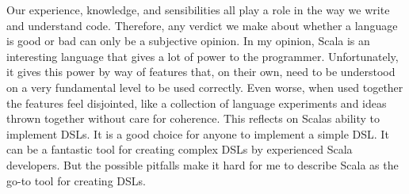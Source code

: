 Our experience, knowledge, and sensibilities all play a role in the way we write and understand code. Therefore, any verdict we make about whether a language is good or bad can only be a subjective opinion. In my opinion, Scala is an interesting language that gives a lot of power to the programmer. Unfortunately, it gives this power by way of features that, on their own, need to be understood on a very fundamental level to be used correctly. Even worse, when used together the features feel disjointed, like a collection of language experiments and ideas thrown together without care for coherence. This reflects on Scalas ability to implement DSLs. It is a good choice for anyone to implement a simple DSL. It can be a fantastic tool for creating complex DSLs by experienced Scala developers. But the possible pitfalls make it hard for me to describe Scala as the go-to tool for creating DSLs.
